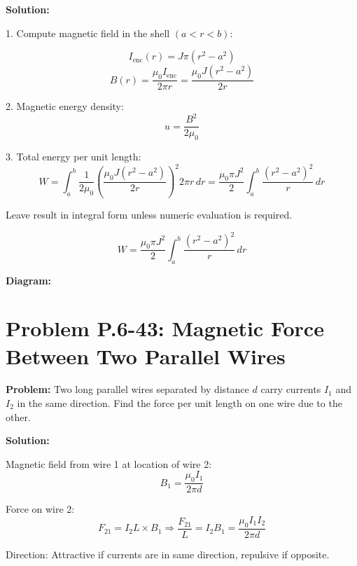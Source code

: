 \documentclass[12pt]{article}
\begin{document}
\textbf{Solution:}

1. Compute magnetic field in the shell \( (a < r < b) \):

\[
I_{\text{enc}}(r) = J \pi (r^2 - a^2)
\]
\[
B(r) = \frac{\mu_0 I_{\text{enc}}}{2\pi r} = \frac{\mu_0 J (r^2 - a^2)}{2r}
\]

2. Magnetic energy density:
\[
u = \frac{B^2}{2\mu_0}
\]

3. Total energy per unit length:
\[
W = \int_a^b \frac{1}{2\mu_0} \left( \frac{\mu_0 J (r^2 - a^2)}{2r} \right)^2 2\pi r \, dr
= \frac{\mu_0 \pi J^2}{2} \int_a^b \frac{(r^2 - a^2)^2}{r} \, dr
\]

Leave result in integral form unless numeric evaluation is required.

\begin{tcolorbox}
\[
\boxed{W = \frac{\mu_0 \pi J^2}{2} \int_a^b \frac{(r^2 - a^2)^2}{r} \, dr}
\]
\end{tcolorbox}

\textbf{Diagram:}
\begin{center}
\end{center}



\section*{Problem P.6-43: Magnetic Force Between Two Parallel Wires}

\textbf{Problem:}  
Two long parallel wires separated by distance \( d \) carry currents \( I_1 \) and \( I_2 \) in the same direction. Find the force per unit length on one wire due to the other.

\textbf{Solution:}

Magnetic field from wire 1 at location of wire 2:
\[
B_1 = \frac{\mu_0 I_1}{2\pi d}
\]

Force on wire 2:
\[
F_{21} = I_2 L \times B_1 \Rightarrow \frac{F_{21}}{L} = I_2 B_1 = \frac{\mu_0 I_1 I_2}{2\pi d}
\]

Direction: Attractive if currents are in same direction, repulsive if opposite.
\end{document}
